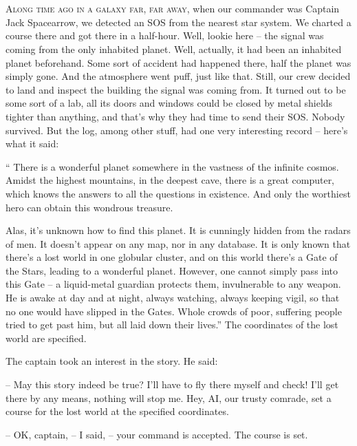 \documentclass[ebook,oneside,final,openright]{memoir}
\begin{document}
\chapter{}
\par
\lettrine{A}{long time ago in a galaxy far, far away,} when our commander was Captain Jack Spacearrow, we detected an SOS from the nearest star system. We charted a course there and got there in a half-hour. Well, lookie here – the signal was coming from the only inhabited planet. Well, actually, it had been an inhabited planet beforehand. Some sort of accident had happened there, half the planet was simply gone. And the atmosphere went puff, just like that. Still, our crew decided to land and inspect the building the signal was coming from. It turned out to be some sort of a lab, all its doors and windows could be closed by metal shields tighter than anything, and that’s why they had time to send their SOS. Nobody survived. But the log, among other stuff, had one very interesting record – here’s what it said:\par
\par
“ There is a wonderful planet somewhere in the vastness of the infinite cosmos. Amidst the highest mountains, in the deepest cave, there is a great computer, which knows the answers to all the questions in existence. And only the worthiest hero can obtain this wondrous treasure. \par
Alas, it’s unknown how to find this planet. It is cunningly hidden from the radars of men. It doesn’t appear on any map, nor in any database. It is only known that there’s a lost world in one globular cluster, and on this world there’s a Gate of the Stars, leading to a wonderful planet. However, one cannot simply pass into this Gate – a liquid-metal guardian protects them, invulnerable to any weapon. He is awake at day and at night, always watching, always keeping vigil, so that no one would have slipped in the Gates. Whole crowds of poor, suffering people tried to get past him, but all laid down their lives.” The coordinates of the lost world are specified.\par
\par
The captain took an interest in the story. He said:\par
– May this story indeed be true? I’ll have to fly there myself and check! I’ll get there by any means, nothing will stop me. Hey, AI, our trusty comrade, set a course for the lost world at the specified coordinates.\par
– OK, captain, – I said, – your command is accepted. The course is set.\par
\end{document}

